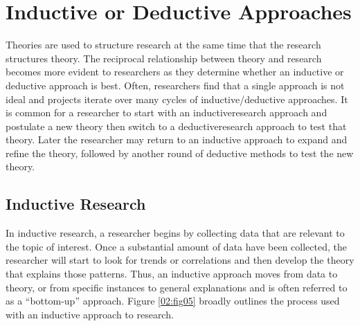 \section{Inductive or Deductive Approaches}

Theories are used to structure research at the same time that the research structures theory. The reciprocal relationship between theory and research becomes more evident to researchers as they determine whether an inductive or deductive approach is best. Often, researchers find that a single approach is not ideal and projects iterate over many cycles of inductive/deductive approaches. It is common for a researcher to start with an \gls{inductiveresearch} approach and postulate a new theory then switch to a \gls{deductiveresearch} approach to test that theory. Later the researcher may return to an inductive approach to expand and refine the theory, followed by another round of deductive methods to test the new theory.

\subsection{Inductive Research}

In inductive research, a researcher begins by collecting data that are relevant to the topic of interest. Once a substantial amount of data have been collected, the researcher will start to look for trends or correlations and then develop the theory that explains those patterns. Thus, an inductive approach moves from data to theory, or from specific instances to general explanations and is often referred to as a ``bottom-up'' approach. Figure \ref{02:fig05} broadly outlines the process used with an inductive approach to research.

